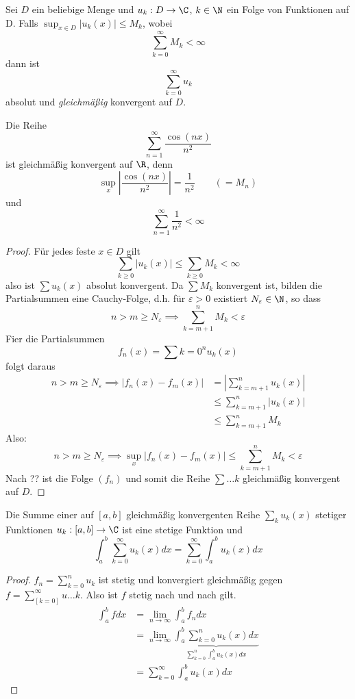 \documentclass[a4paper,10pt]{scrbook}
\begin{document}
\begin{thm}
Sei $D$ ein beliebige Menge und $u_k:D\to\C$, $k\in\N$ ein Folge von Funktionen auf D.
Falls $\sup_{x\in D}|u_k(x)|\le M_k$, wobei
\[
\sum_{k=0}^\infty M_k<\infty
\]
dann ist 
\[
\sum_{k=0}^\infty u_k
\]
absolut und \emph{gleichmäßig} konvergent auf $D$.
\begin{ex*}
Die Reihe
\[
\sum_{n=1}^\infty \frac{\cos(nx)}{n^2}
\]
ist gleichmäßig konvergent auf $\R$, denn
\[
\sup_x\left|\frac{\cos(nx)}{n^2}\right|=\frac 1{n^2}\qquad (=M_n)
\]
und
\[
\sum_{n=1}^\infty\frac 1{n^2}<\infty
\]
\end{ex*}
\begin{proof}
Für jedes feste $x \in D$ gilt
\[
\sum_{k\ge 0} |u_k(x)|\le \sum_{k\ge 0}M_k <\infty
\]
also ist $\sum u_k(x)$ absolut konvergent.
Da $\sum M_k$ konvergent ist, bilden die Partialsummen eine Cauchy-Folge, d.h. für $\varepsilon>0$ existiert $N_\varepsilon\in \N$, so dass
\[
n>m\ge N_\varepsilon \implies \sum_{k=m+1}^n M_k <\varepsilon
\]
Fier die Partialsummen
\[
f_n(x)=\sum{k=0}^n u_k(x)
\]
folgt daraus
\begin{align*}
n>m\ge N_\varepsilon \implies |f_n(x)-f_m(x)| &= |\sum_{k=m+1}^n u_k(x)|\\
&\le \sum_{k=m+1}^n |u_k(x)|\\
&\le \sum_{k=m+1}^n M_k
\end{align*}
Also:
\[
n>m\ge N_\varepsilon \implies \sup_x|f_n(x)-f_m(x)| \le \sum_{k=m+1}^n M_k < \varepsilon
\]
Nach ?? ist die Folge $(f_n)$ und somit die Reihe $\sum …k$ gleichmäßig konvergent auf $D$.
\end{proof}
\end{thm}

\begin{st}
Die Summe einer auf $[a,b]$ gleichmäßig konvergenten Reihe
$\sum_k u_k(x)$ stetiger Funktionen $u_k:[a,b]\to\C$ ist eine stetige Funktion und
\[
\int_a^b\sum_{k=0}^\infty u_k(x)dx = \sum_{k=0}^\infty\int_a^b u_k(x)dx
\]
\begin{proof}
$f_n =\sum_{k=0}^n u_k$ ist stetig und konvergiert gleichmäßig gegen $f=\sum_[k=0]^\infty u…k$.
Also ist $f$ stetig nach \fixme[thm??] und nach \fixme[thm??] gilt.
\begin{align*}
\int_a^b fdx
&=\lim_{n\to\infty}\int_a^b f_ndx\\
&=\lim_{n\to\infty} \underbrace{\int_a^b \sum_{k=0}^n u_k(x)dx}_{\sum_{k=0}^n\int_a^b u_k(x)dx}\\
&=\sum_{k=0}^\infty\int_a^b u_k(x)dx
\end{align*}
\end{proof}
\end{st}
\end{document}
